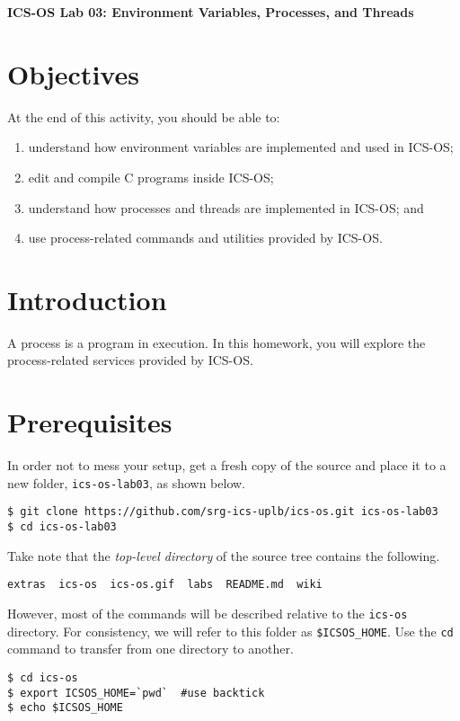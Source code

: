 \documentclass[a4paper, 11pt,oneside]{article}
\begin{document}
\begin{center}
   {\LARGE \textbf{ICS-OS Lab 03: Environment Variables, Processes, and Threads}}
\end{center}

\section*{Objectives}
   At the end of this activity, you should be able to:
   \begin{enumerate}[itemsep=0pt,parsep=0pt]
       \item understand how environment variables are implemented and used in ICS-OS;
       \item edit and compile C programs inside ICS-OS;
       \item understand how processes and threads are implemented in ICS-OS; and
       \item use process-related commands and utilities provided by ICS-OS.
   \end{enumerate}   

\section{Introduction}
A process is a program in execution. In this homework, you will explore the process-related services provided by ICS-OS. 

\section{Prerequisites}
In order not to mess your setup, get a fresh copy of the source and place it to a new folder, \texttt{ics-os-lab03}, as shown below. 

\begin{verbatim}
$ git clone https://github.com/srg-ics-uplb/ics-os.git ics-os-lab03
$ cd ics-os-lab03
\end{verbatim}

Take note that the \textit{top-level directory} of the source 
tree contains the following. 

\begin{verbatim}
extras  ics-os  ics-os.gif  labs  README.md  wiki
\end{verbatim}

However, most of the commands will be described relative to the \texttt{ics-os} directory.
For consistency, we will refer to this folder as \texttt{\$ICSOS\_HOME}. Use the \texttt{cd} 
command to transfer from one directory to another.
\begin{Verbatim}[frame=single]
$ cd ics-os
$ export ICSOS_HOME=`pwd`  #use backtick
$ echo $ICSOS_HOME
\end{Verbatim}
\end{document}
